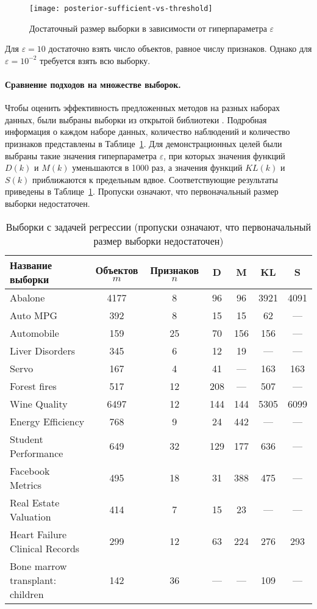 \begin{figure}[h!]
    \centering
    \texttt{[image: posterior-sufficient-vs-threshold]}
    \caption{Достаточный размер выборки в зависимости от гиперпараметра $\varepsilon$}
    \label{posterior-sufficient-vs-threshold}
\end{figure}

Для $\varepsilon=10$ достаточно взять число объектов, равное числу признаков. Однако для $\varepsilon=10^{-2}$ требуется взять всю выборку.

\paragraph{Сравнение подходов на множестве выборок.}

Чтобы оценить эффективность предложенных методов на разных наборах данных, были выбраны выборки из открытой библиотеки \cite{UCI}. Подробная информация о каждом наборе данных, количество наблюдений и количество признаков представлены в Таблице~\ref{table}. Для демонстрационных целей были выбраны такие значения гиперпараметра $\varepsilon$, при которых значения функций $D(k)$ и $M(k)$ уменьшаются в 1000 раз, а значения функций $KL(k)$ и $S(k)$ приближаются к предельным вдвое. Соответствующие результаты приведены в Таблице~\ref{table}. Пропуски означают, что первоначальный размер выборки недостаточен.

\begin{table}
    \centering
    \caption{Выборки с задачей регрессии (пропуски означают, что первоначальный размер выборки недостаточен)}\label{table}
    {\small
    \begin{tabular}{lcc|cc|cc}
        \toprule
        Название выборки & Объектов $m$ & Признаков $n$ & D & M & KL & S \\
        \midrule
        Abalone & 4177 & 8 & 96 & 96 & 3921 & 4091 \\
        Auto MPG & 392 & 8 & 15 & 15 & 62 & --- \\
        Automobile & 159 & 25 & 70 & 156 & 156 & --- \\
        Liver Disorders & 345 & 6 & 12 & 19 & --- & --- \\
        Servo & 167 & 4 & 41 & --- & 163 & 163 \\
        Forest fires & 517 & 12 & 208 & --- & 507 & --- \\
        Wine Quality & 6497 & 12 & 144 & 144 & 5305 & 6099 \\
        Energy Efficiency & 768 & 9 & 24 & 442 & --- & --- \\
        Student Performance & 649 & 32 & 129 & 177 & 636 & --- \\
        Facebook Metrics & 495 & 18 & 31 & 388 & 475 & ---  \\
        Real Estate Valuation & 414 & 7 & 15 & 23 & --- & --- \\
        Heart Failure Clinical Records & 299 & 12 & 63 & 224 & 276 & 293 \\
        Bone marrow transplant: children & 142 & 36 & --- & --- & 109 & --- \\
        \bottomrule
        \end{tabular}}
\end{table}

